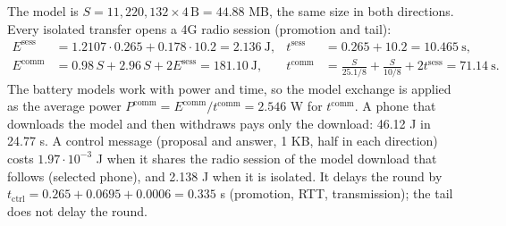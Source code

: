\documentclass[11pt,a4paper]{article}
\begin{document}
The model is $S = 11{,}220{,}132 \times 4\,\text{B} = 44.88$ MB, the same size in
both directions. Every isolated transfer opens a 4G radio session (promotion and
tail):
\begin{align}
  E^{\mathrm{sess}} &= 1.2107 \cdot 0.265 + 0.178 \cdot 10.2 = 2.136~\text{J},
  & t^{\mathrm{sess}} &= 0.265 + 10.2 = 10.465~\text{s}, \\
  E^{\mathrm{comm}} &= 0.98\,S + 2.96\,S + 2 E^{\mathrm{sess}} = 181.10~\text{J},
  & t^{\mathrm{comm}} &= \frac{S}{25.1/8} + \frac{S}{10/8} + 2 t^{\mathrm{sess}} = 71.14~\text{s}.
\end{align}
The battery models work with power and time, so the model exchange is applied
as the average power $P^{\mathrm{comm}} = E^{\mathrm{comm}} / t^{\mathrm{comm}}
= 2.546$ W for $t^{\mathrm{comm}}$. A phone that downloads the model and then
withdraws pays only the download: 46.12 J in 24.77 s. A control message
(proposal and answer, 1 KB, half in each direction) costs $1.97 \cdot 10^{-3}$ J
when it shares the radio session of the model download that follows (selected
phone), and 2.138 J when it is isolated. It delays the round by
$t_{\mathrm{ctrl}} = 0.265 + 0.0695 + 0.0006 = 0.335$ s (promotion, RTT,
transmission); the tail does not delay the round.
\end{document}
